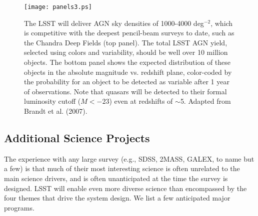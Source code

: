 \documentclass{emulateapj}
\begin{document}
\begin{figure}
\texttt{[image: panels3.ps]}
\caption{The LSST will deliver AGN sky densities of 1000-4000 deg$^{-2}$, which is 
competitive with the deepest pencil-beam surveys to date, such as the Chandra
Deep Fields (top panel). The total LSST AGN yield, selected using colors and
variability, should be well over 10 million objects. 
The bottom panel shows the expected distribution of these objects in the 
absolute magnitude vs. redshift plane, color-coded by the probability for
an object to be
detected as variable after 1 year of observations. Note that quasars will
be detected to their formal luminosity cutoff ($M< -23$) even at redshifts
of $\sim$5. Adapted from Brandt et al. (2007).} 
\label{Fig:panels3}
\end{figure}


\subsection{  Additional Science Projects}

The experience with any large survey (e.g., SDSS, 2MASS, GALEX, to name but a 
few) is that much of their most interesting science is often unrelated to 
the main science drivers, and is often unanticipated at the time the survey is 
designed. LSST will enable even more diverse science than encompassed by the 
four themes that drive the system design. We list a few anticipated major 
programs.
\end{document}

